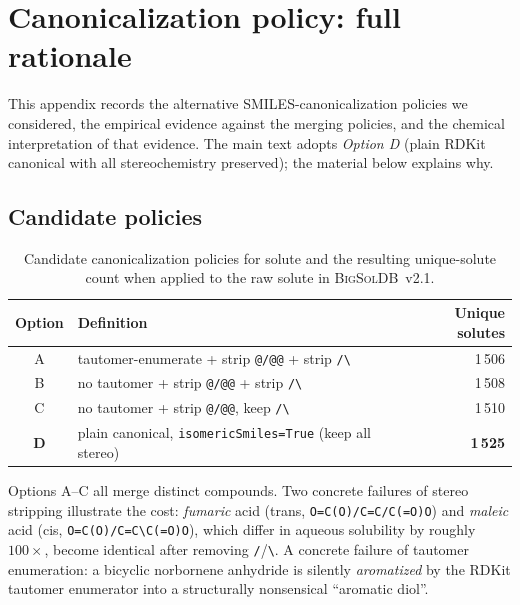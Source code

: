 
\section{Canonicalization policy: full rationale}
\label{app:canonicalization}

This appendix records the alternative SMILES-canonicalization policies we
considered, the empirical evidence against the merging policies, and the
chemical interpretation of that evidence.  The main text adopts \emph{Option
D} (plain RDKit canonical with all stereochemistry preserved); the
material below explains why.

\subsection{Candidate policies}

\begin{table}[h]
\centering\small
\caption{Candidate canonicalization policies for solute \SMILES{} and the
resulting unique-solute count when applied to the  raw
solute \SMILES{} in \textsc{BigSolDB}~v2.1.}
\label{tab:canonicalization}
\begin{tabular}{@{}clr@{}}
\toprule
Option & Definition & Unique solutes \\
\midrule
A & tautomer-enumerate + strip \texttt{@/@@} + strip \texttt{/\textbackslash} & 1\,506 \\
B & no tautomer         + strip \texttt{@/@@} + strip \texttt{/\textbackslash} & 1\,508 \\
C & no tautomer         + strip \texttt{@/@@}, keep \texttt{/\textbackslash} & 1\,510 \\
\textbf{D} & plain canonical, \texttt{isomericSmiles=True} (keep all stereo) & \textbf{1\,525} \\
\bottomrule
\end{tabular}
\end{table}

Options A--C all merge distinct compounds.  Two concrete failures of stereo
stripping illustrate the cost: \emph{fumaric} acid (trans,
\verb|O=C(O)/C=C/C(=O)O|) and \emph{maleic} acid (cis,
\verb|O=C(O)/C=C\C(=O)O|), which differ in aqueous solubility by roughly
$100\times$, become identical after removing
\texttt{/}/\texttt{\textbackslash}.  A concrete failure of tautomer
enumeration: a bicyclic norbornene anhydride is silently \emph{aromatized}
by the RDKit tautomer enumerator into a structurally nonsensical
``aromatic diol''.

